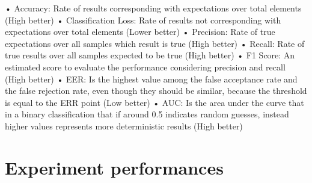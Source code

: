 • Accuracy: Rate of results corresponding with expectations over total elements (High better)\newline
• Classification Loss: Rate of results not corresponding with expectations over total elements (Lower better)\newline
• Precision: Rate of true expectations over all samples which result is true (High better)\newline
• Recall: Rate of true results over all samples expected to be true (High better)\newline
• F1 Score: An estimated score to evaluate the performance considering precision and recall (High better)\newline
• EER: Is the highest value among the false acceptance rate and the false rejection rate, even though they should be similar, because the threshold is equal to the ERR point (Low better)\newline
• AUC: Is the area under the curve that in a binary classification that if around 0.5 indicates random guesses, instead higher values represents more deterministic results (High better)\newline
\section{Experiment performances}
\label{sec:experiment performance}
